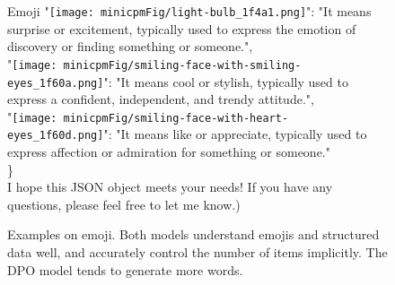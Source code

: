 \begin{figure}[]
{\begin{AIbox}{Emoji}
{{    "\texttt{[image: minicpmFig/light-bulb\_1f4a1.png]}": "It means surprise or excitement, typically used to express the emotion of discovery or finding something or someone.",\\
    "\texttt{[image: minicpmFig/smiling-face-with-smiling-eyes\_1f60a.png]}": "It means cool or stylish, typically used to express a confident, independent, and trendy attitude.",\\
    "\texttt{[image: minicpmFig/smiling-face-with-heart-eyes\_1f60d.png]}": "It means like or appreciate, typically used to express affection or admiration for something or someone."\\
    \} \\
    I hope this JSON object meets your needs! If you have any questions, please feel free to let me know.})
    }
    \hspace{0.01\linewidth}
    \end{AIbox}
    }
    \caption{Examples on emoji. Both models understand emojis and structured data well, and accurately control the number of items implicitly. The DPO model tends to generate more words. }
    \label{fig:emoji}
    \end{figure}